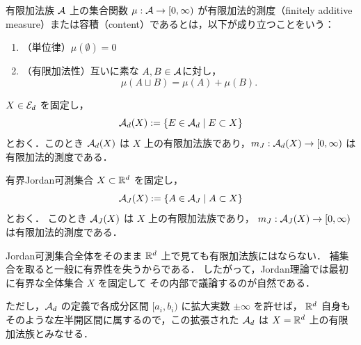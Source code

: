 \begin{definition}[有限加法的測度]
有限加法族 $\mathcal A$ 上の集合関数 $\mu : \mathcal A \to [0,\infty)$ が有限加法的測度（finitely additive measure）または容積（content）であるとは，以下が成り立つことをいう：
\begin{enumerate}
    \item （単位律）$\mu(\emptyset) = 0$
    \item （有限加法性）互いに素な $A,B \in \mathcal A$に対し，
\[
\mu(A \sqcup B) = \mu(A)+\mu(B).
\]
\end{enumerate}
\end{definition}

\begin{example}
    $X \in \mathcal E_d$ を固定し，
    \[
    \mathcal A_d(X):=\{E \in \mathcal A_d \mid E \subset X\}
    \]
    とおく．このとき $\mathcal A_d(X)$ は $X$ 上の有限加法族であり，$m_J : \mathcal A_d(X) \to [0,\infty)$ は有限加法的測度である．
\end{example}

\begin{example}[Jordan可測集合の有限加法族]
有界Jordan可測集合 $X \subset \mathbb R^d$ を固定し，
\[
\mathcal A_J(X) := \{A \in \mathcal A_J \mid A \subset X\}
\]
とおく．
このとき $\mathcal A_J(X)$ は $X$ 上の有限加法族であり，
$m_J : \mathcal A_J(X) \to [0,\infty)$ は有限加法的測度である．
\end{example}

\begin{remark}
Jordan可測集合全体をそのまま $\mathbb R^d$ 上で見ても有限加法族にはならない．
補集合を取ると一般に有界性を失うからである．
したがって，Jordan理論では最初に有界な全体集合 $X$ を固定して
その内部で議論するのが自然である．

ただし，$\mathcal A_d$ の定義で各成分区間 $[a_i,b_i)$ に拡大実数 $\pm\infty$ を許せば，
$\mathbb R^d$ 自身もそのような左半開区間に属するので，この拡張された $\mathcal A_d$ は
$X=\mathbb R^d$ 上の有限加法族とみなせる．
\end{remark}


